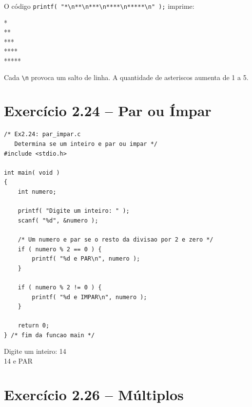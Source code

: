 \documentclass[12pt,a4paper]{article}
\begin{document}
\begin{respostabox}[title={Exercício 2.22}]
O código \texttt{printf( "*\textbackslash n**\textbackslash n***\textbackslash n****\textbackslash n*****\textbackslash n" );} imprime:

\begin{saida}
*\\
**\\
***\\
****\\
*****
\end{saida}

Cada \texttt{\textbackslash n} provoca um salto de linha. A quantidade de asteriscos aumenta de 1 a 5.
\end{respostabox}

\section{Exercício 2.24 -- Par ou Ímpar}

\begin{respostabox}[title={Exercício 2.24 -- Par ou ímpar com operador módulo}]
\begin{lstlisting}
/* Ex2.24: par_impar.c
   Determina se um inteiro e par ou impar */
#include <stdio.h>

int main( void )
{
    int numero;

    printf( "Digite um inteiro: " );
    scanf( "%d", &numero );

    /* Um numero e par se o resto da divisao por 2 e zero */
    if ( numero % 2 == 0 ) {
        printf( "%d e PAR\n", numero );
    }

    if ( numero % 2 != 0 ) {
        printf( "%d e IMPAR\n", numero );
    }

    return 0;
} /* fim da funcao main */
\end{lstlisting}

\begin{saida}
Digite um inteiro: 14\\
14 e PAR
\end{saida}
\end{respostabox}

\section{Exercício 2.26 -- Múltiplos}
\end{document}
